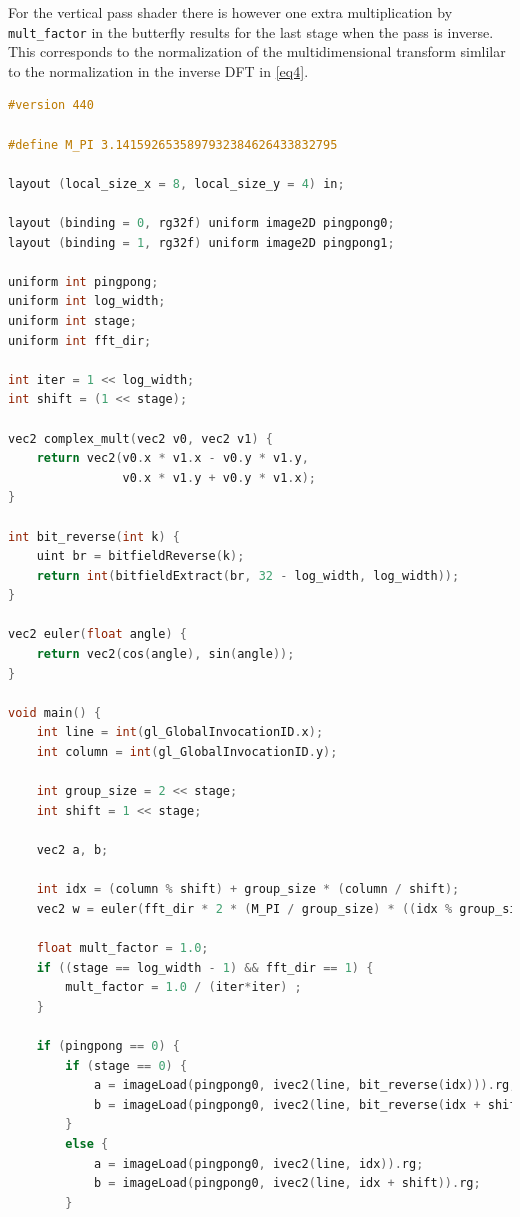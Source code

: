 \documentclass[
  oneside,
  11pt, a4paper,
  footinclude=true,
  headinclude=true,
  cleardoublepage=empty
]{scrbook}
\begin{document}
For the vertical pass shader there is however one extra multiplication by \texttt{mult_factor} in the butterfly results for the last stage when the pass is inverse. This corresponds to the normalization of the multidimensional transform simlilar to the normalization in the inverse DFT in \autoref{eq4}.

\begin{lstlisting}[language=C,caption={FFT Cooley-Tukey Vertical},label={lst:ct-vertical}]
#version 440

#define M_PI 3.1415926535897932384626433832795

layout (local_size_x = 8, local_size_y = 4) in;

layout (binding = 0, rg32f) uniform image2D pingpong0;
layout (binding = 1, rg32f) uniform image2D pingpong1;

uniform int pingpong;
uniform int log_width;
uniform int stage;
uniform int fft_dir;

int iter = 1 << log_width;
int shift = (1 << stage);

vec2 complex_mult(vec2 v0, vec2 v1) {
	return vec2(v0.x * v1.x - v0.y * v1.y,
				v0.x * v1.y + v0.y * v1.x);
}

int bit_reverse(int k) {
    uint br = bitfieldReverse(k);
    return int(bitfieldExtract(br, 32 - log_width, log_width));
}

vec2 euler(float angle) {
	return vec2(cos(angle), sin(angle));
}

void main() {
	int line = int(gl_GlobalInvocationID.x);
	int column = int(gl_GlobalInvocationID.y);

	int group_size = 2 << stage;
	int shift = 1 << stage;

	vec2 a, b;

    int idx = (column % shift) + group_size * (column / shift);
    vec2 w = euler(fft_dir * 2 * (M_PI / group_size) * ((idx % group_size) % shift));

    float mult_factor = 1.0;
    if ((stage == log_width - 1) && fft_dir == 1) {
        mult_factor = 1.0 / (iter*iter) ;
    }

    if (pingpong == 0) {
        if (stage == 0) {
            a = imageLoad(pingpong0, ivec2(line, bit_reverse(idx))).rg;
            b = imageLoad(pingpong0, ivec2(line, bit_reverse(idx + shift))).rg;
        }
        else {
            a = imageLoad(pingpong0, ivec2(line, idx)).rg;
            b = imageLoad(pingpong0, ivec2(line, idx + shift)).rg;
        }
        

\end{lstlisting}
\end{document}
